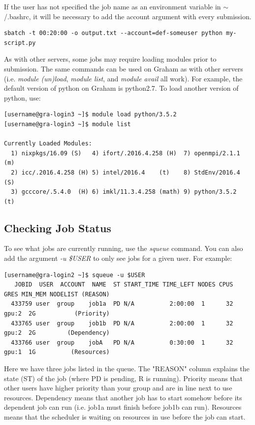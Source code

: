 \documentclass[12pt]{article}
\begin{document}
\quad If the user has not specified the job name as an environment variable in $\sim$/.bashrc, it will be necessary to add the account argument with every submission.

\begin{lstlisting}[numbers=none, basicstyle=\normalsize]
sbatch -t 00:20:00 -o output.txt --account=def-someuser python my-script.py
\end{lstlisting}

\quad As with other servers, some jobs may require loading modules prior to submission. The same commands can be used on Graham as with other servers (i.e. \textit{module (un)load}, \textit{module list}, and \textit{module avail} all work). For example, the default version of python on Graham is python2.7. To load another version of python, use:

\begin{lstlisting}[numbers=none]
[username@gra-login3 ~]$ module load python/3.5.2
[username@gra-login3 ~]$ module list

Currently Loaded Modules:
  1) nixpkgs/16.09 (S)   4) ifort/.2016.4.258 (H)  7) openmpi/2.1.1 (m)
  2) icc/.2016.4.258 (H) 5) intel/2016.4    (t)    8) StdEnv/2016.4 (S)
  3) gcccore/.5.4.0  (H) 6) imkl/11.3.4.258 (math) 9) python/3.5.2  (t)

\end{lstlisting}

\subsection{Checking Job Status}

\quad To see what jobs are currently running, use the \textit{squeue} command. You can also add the argument \textit{-u \$USER} to only see jobs for a given user. For example:

\begin{lstlisting}[numbers=none, basicstyle=\tiny]
[username@gra-login2 ~]$ squeue -u $USER
   JOBID  USER  ACCOUNT  NAME  ST START_TIME TIME_LEFT NODES CPUS   GRES MIN_MEM NODELIST (REASON) 
  433759 user  group    job1a  PD N/A          2:00:00  1      32  gpu:2  2G           (Priority) 
  433765 user  group    job1b  PD N/A          2:00:00  1      32  gpu:2  2G         (Dependency) 
  433766 user  group    jobA   PD N/A          0:30:00  1      32  gpu:1  1G          (Resources) 
\end{lstlisting} 

\quad Here we have three jobs listed in the queue. The "REASON" column explains the state (ST) of the job (where PD is pending, R is running). Priority means that other users have higher priority than your group and are in line next to use resources. Dependency means that another job has to start somehow before its dependent job can run (i.e. job1a must finish before job1b can run). Resources means that the scheduler is waiting on resources in use before the job can start. 
\end{document}
